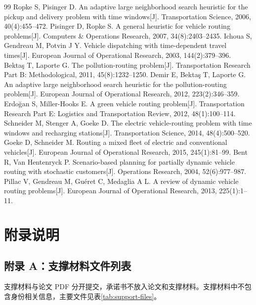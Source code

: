 \documentclass[UTF8,zihao=-4,a4paper]{ctexart}
\begin{document}
\begin{thebibliography}{99}
 Ropke S, Pisinger D. An adaptive large neighborhood search heuristic for the pickup and delivery problem with time windows[J]. Transportation Science, 2006, 40(4):455--472.
 Pisinger D, Ropke S. A general heuristic for vehicle routing problems[J]. Computers \& Operations Research, 2007, 34(8):2403--2435.
 Ichoua S, Gendreau M, Potvin J Y. Vehicle dispatching with time-dependent travel times[J]. European Journal of Operational Research, 2003, 144(2):379--396.
 Bektaş T, Laporte G. The pollution-routing problem[J]. Transportation Research Part B: Methodological, 2011, 45(8):1232--1250.
 Demir E, Bektaş T, Laporte G. An adaptive large neighborhood search heuristic for the pollution-routing problem[J]. European Journal of Operational Research, 2012, 223(2):346--359.
 Erdoğan S, Miller-Hooks E. A green vehicle routing problem[J]. Transportation Research Part E: Logistics and Transportation Review, 2012, 48(1):100--114.
 Schneider M, Stenger A, Goeke D. The electric vehicle-routing problem with time windows and recharging stations[J]. Transportation Science, 2014, 48(4):500--520.
 Goeke D, Schneider M. Routing a mixed fleet of electric and conventional vehicles[J]. European Journal of Operational Research, 2015, 245(1):81--99.
 Bent R, Van Hentenryck P. Scenario-based planning for partially dynamic vehicle routing with stochastic customers[J]. Operations Research, 2004, 52(6):977--987.
 Pillac V, Gendreau M, Guéret C, Medaglia A L. A review of dynamic vehicle routing problems[J]. European Journal of Operational Research, 2013, 225(1):1--11.
\end{thebibliography}

\clearpage
\appendix
\section{附录说明}

\subsection{附录 A：支撑材料文件列表}

支撑材料与论文 PDF 分开提交，承诺书不放入论文和支撑材料。支撑材料中不包含身份相关信息，主要文件见表\ref{tab:support-files}。
\end{document}
